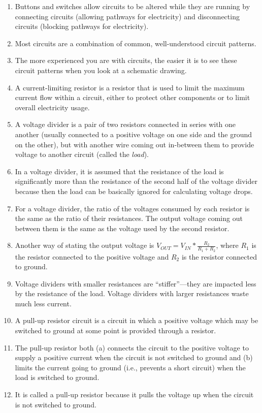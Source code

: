 \begin{enumerate}
\item Buttons and switches allow circuits to be altered while they are running by connecting circuits (allowing pathways for electricity) and disconnecting circuits (blocking pathways for electricity).
\item Most circuits are a combination of common, well-understood circuit patterns.
\item The more experienced you are with circuits, the easier it is to see these circuit patterns when you look at a schematic drawing.
\item A current-limiting resistor is a resistor that is used to limit the maximum current flow within a circuit, either to protect other components or to limit overall electricity usage.
\item A voltage divider is a pair of two resistors connected in series with one another (usually connected to a positive voltage on one side and the ground on the other), but with another wire coming out in-between them to provide voltage to another circuit (called the \emph{load}).
\item In a voltage divider, it is assumed that the resistance of the load is significantly more than the resistance of the second half of the voltage divider because then the load can be basically ignored for calculating voltage drops.
\item For a voltage divider, the ratio of the voltages consumed by each resistor is the same as the ratio of their resistances.  The output voltage coming out between them is the same as the voltage used by the second resistor.
\item Another way of stating the output voltage is $V_{OUT} = V_{IN} * \frac{R_2}{R_1 + R_2}$, where $R_1$ is the resistor connected to the positive voltage and $R_2$ is the resistor connected to ground.
\item Voltage dividers with smaller resistances are ``stiffer''---they are impacted less by the resistance of the load.  Voltage dividers with larger resistances waste much less current.
\item A pull-up resistor circuit is a circuit in which a positive voltage which may be switched to ground at some point is provided through a resistor.
\item The pull-up resistor both (a) connects the circuit to the positive voltage to supply a positive current when the circuit is not switched to ground and (b) limits the current going to ground (i.e., prevents a short circuit) when the load is switched to ground.
\item It is called a pull-up resistor because it pulls the voltage up when the circuit is not switched to ground.
\end{enumerate}

\applysection


